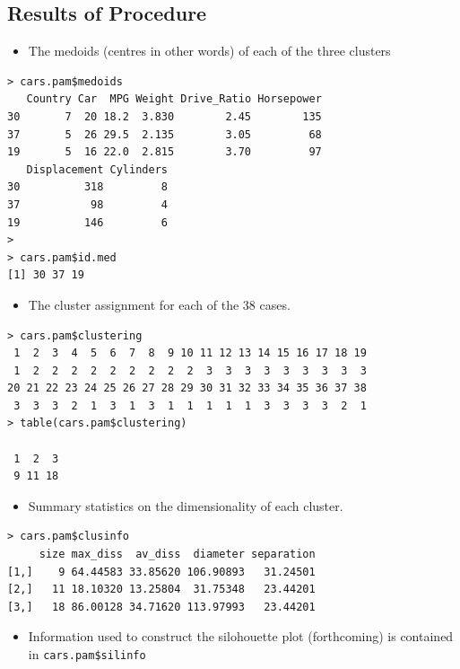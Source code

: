 \documentclass[12pt]{article}
\begin{document}
\subsection*{Results of Procedure}
\begin{itemize}
\item The medoids (centres in other words) of each of the three clusters
\end{itemize}
\begin{framed}
\begin{verbatim}
> cars.pam$medoids
   Country Car  MPG Weight Drive_Ratio Horsepower
30       7  20 18.2  3.830        2.45        135
37       5  26 29.5  2.135        3.05         68
19       5  16 22.0  2.815        3.70         97
   Displacement Cylinders
30          318         8
37           98         4
19          146         6
>
> cars.pam$id.med
[1] 30 37 19
\end{verbatim}
\end{framed}


\begin{itemize}
\item The cluster assignment for each of the 38 cases.
\end{itemize}
\begin{framed}
\begin{verbatim}
> cars.pam$clustering
 1  2  3  4  5  6  7  8  9 10 11 12 13 14 15 16 17 18 19 
 1  2  2  2  2  2  2  2  2  2  3  3  3  3  3  3  3  3  3 
20 21 22 23 24 25 26 27 28 29 30 31 32 33 34 35 36 37 38 
 3  3  3  2  1  3  1  3  1  1  1  1  1  3  3  3  3  2  1
> table(cars.pam$clustering)

 1  2  3 
 9 11 18 

\end{verbatim}
\end{framed}
\begin{itemize}
\item Summary statistics on the dimensionality of each cluster.
\end{itemize}
\begin{framed}
\begin{verbatim}
> cars.pam$clusinfo
     size max_diss  av_diss  diameter separation
[1,]    9 64.44583 33.85620 106.90893   31.24501
[2,]   11 18.10320 13.25804  31.75348   23.44201
[3,]   18 86.00128 34.71620 113.97993   23.44201
\end{verbatim}
\end{framed}
\begin{itemize}
\item Information used to construct the silohouette plot (forthcoming) is contained in \texttt{cars.pam\$silinfo}
\end{itemize}
\end{document}
